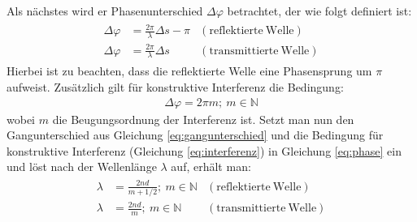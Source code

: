 Als nächstes wird er Phasenunterschied $\Delta \varphi$ betrachtet, der wie folgt definiert ist:
\begin{gather}
	\begin{aligned}
		 \Delta \varphi &= \frac{2\pi}{\lambda}\Delta s - \pi &\mathrm{(reflektierte~Welle)}\\
		 \Delta \varphi &= \frac{2\pi}{\lambda}\Delta s &\mathrm{(transmittierte~Welle)}
	\end{aligned}
	\label{eq:phase}
\end{gather}
Hierbei ist zu beachten, dass die reflektierte Welle eine Phasensprung um $\pi$ aufweist. Zusätzlich gilt für konstruktive Interferenz die Bedingung:
\begin{gather}
	\boxed{\Delta \varphi = 2\pi m;~m \in \mathbb{N}}
	\label{eq:interferenz}
\end{gather}
wobei $m$ die Beugungsordnung der Interferenz ist. Setzt man nun den Gangunterschied aus Gleichung \ref{eq:gangunterschied} und die Bedingung für konstruktive Interferenz (Gleichung \ref{eq:interferenz}) in Gleichung \ref{eq:phase} ein und löst nach der Wellenlänge $\lambda$ auf, erhält man: \cite{DemtroederOptik}
\begin{gather}
	\boxed{
	\begin{aligned}
		 \lambda &= \frac{2nd}{m + 1/2};~m \in \mathbb{N} &\mathrm{(reflektierte~Welle)}\\
		 \lambda &= \frac{2nd}{m};~m \in \mathbb{N} &\mathrm{(transmittierte~Welle)}
	\end{aligned}
	}
	\label{eq:phase}
\end{gather}